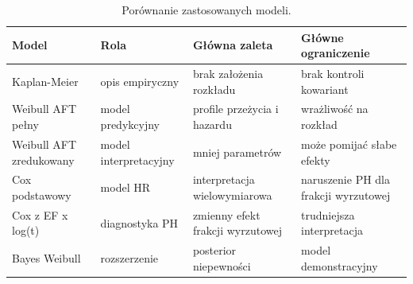 \begin{table}[htbp]
\centering
\caption{Porównanie zastosowanych modeli.}
\label{tab:synthesis}
\scriptsize
\setlength{\tabcolsep}{2.4pt}
\begin{tabular}{p{}p{}p{}p{}}
\toprule
Model & Rola & Główna zaleta & Główne ograniczenie \\
\midrule
Kaplan-Meier & opis empiryczny & brak założenia rozkładu & brak kontroli kowariant \\
Weibull AFT pełny & model predykcyjny & profile przeżycia i hazardu & wrażliwość na rozkład \\
Weibull AFT zredukowany & model interpretacyjny & mniej parametrów & może pomijać słabe efekty \\
Cox podstawowy & model HR & interpretacja wielowymiarowa & naruszenie PH dla frakcji wyrzutowej \\
Cox z EF x log(t) & diagnostyka PH & zmienny efekt frakcji wyrzutowej & trudniejsza interpretacja \\
Bayes Weibull & rozszerzenie & posterior niepewności & model demonstracyjny \\
\bottomrule
\end{tabular}
\end{table}

